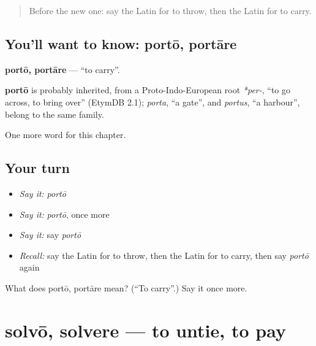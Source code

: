 \label{lesson:LA-C156-porto}



\begin{quote}
Before the new one: say the Latin for to throw, then the Latin for to carry.
\end{quote}

\subsection*{You'll want to know: portō, portāre}
\textbf{portō, portāre} — \textquotedblleft{}to carry\textquotedblright{}.

\begin{cousinweb}
\textbf{portō} is probably inherited, from a Proto-Indo-European root \emph{*per-}, \textquotedblleft{}to go across, to bring over\textquotedblright{} (EtymDB 2.1); \emph{porta}, \textquotedblleft{}a gate\textquotedblright{}, and \emph{portus}, \textquotedblleft{}a harbour\textquotedblright{}, belong to the same family.
\end{cousinweb}

\begin{grammarlens}[title={What you've built}]
One more word for this chapter.
\end{grammarlens}

\subsection*{Your turn}
\begin{itemize}
\raggedright
  \item \emph{Say it:} \emph{portō}
  \item \emph{Say it:} \emph{portō}, once more
  \item \emph{Say it:} say \emph{portō}
  \item \emph{Recall:} say the Latin for to throw, then the Latin for to carry, then say \emph{portō} again
\end{itemize}

\begin{tcolorbox}[breakable,colback=teal!4,colframe=teal!35!black,title={Before you move on}]
What does portō, portāre mean? (\textquotedblleft{}To carry\textquotedblright{}.) Say it once more.
\end{tcolorbox}
\section[solvō, solvere]{solvō, solvere — to untie, to pay}

